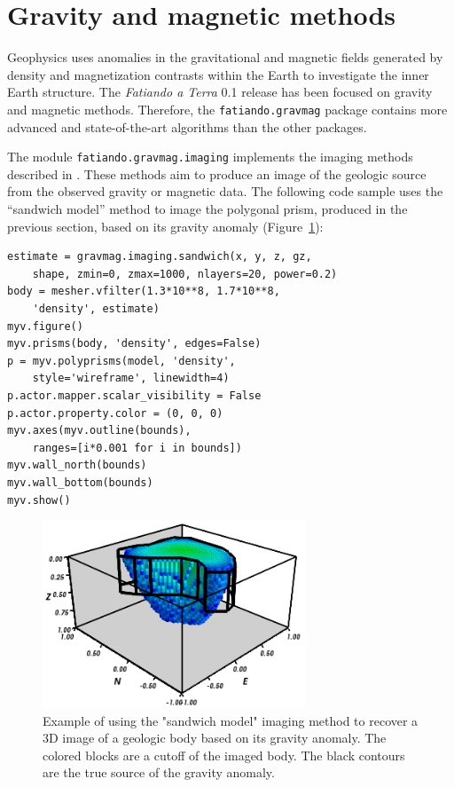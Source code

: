 \section{Gravity and magnetic methods}

Geophysics uses anomalies in the gravitational and magnetic fields
generated by density and magnetization contrasts within the Earth to
investigate the inner Earth structure. The \textit{Fatiando a Terra} 0.1 release
has been focused on gravity and magnetic methods. Therefore, the
\texttt{fatiando.gravmag} package contains more advanced and
state-of-the-art algorithms than the other packages.

The module \texttt{fatiando.gravmag.imaging} implements the imaging methods
described in \citet{fedi2012}. These methods aim to produce an image of the
geologic source from the observed gravity or magnetic data. The following code
sample uses the ``sandwich model'' method \citep{pedersen1991} to image the
polygonal prism, produced in the previous section, based on its gravity anomaly
(Figure~\ref{fig:p1-imaging}):

\begin{verbatim}
estimate = gravmag.imaging.sandwich(x, y, z, gz,
    shape, zmin=0, zmax=1000, nlayers=20, power=0.2)
body = mesher.vfilter(1.3*10**8, 1.7*10**8,
    'density', estimate)
myv.figure()
myv.prisms(body, 'density', edges=False)
p = myv.polyprisms(model, 'density',
    style='wireframe', linewidth=4)
p.actor.mapper.scalar_visibility = False
p.actor.property.color = (0, 0, 0)
myv.axes(myv.outline(bounds),
    ranges=[i*0.001 for i in bounds])
myv.wall_north(bounds)
myv.wall_bottom(bounds)
myv.show()
\end{verbatim}

\begin{figure}
    \centering
    \includegraphics[width=0.7\textwidth]{figures/paper-fatiando/gravmag_imaging}
    \caption{
        Example of using the "sandwich model" imaging method to recover a 3D
        image of a geologic body based on its gravity anomaly. The colored
        blocks are a cutoff of the imaged body. The black contours are the true
        source of the gravity anomaly.
    }
    \label{fig:p1-imaging}
\end{figure}

